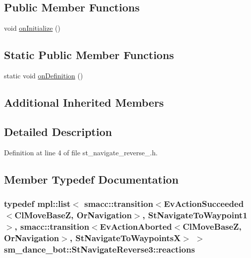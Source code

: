 \subsection*{Public Member Functions}
\begin{DoxyCompactItemize}
\item 
void \hyperlink{structsm__dance__bot_1_1StNavigateReverse3_a3b04480408724a0c98836d209e62266c}{on\+Initialize} ()
\end{DoxyCompactItemize}
\subsection*{Static Public Member Functions}
\begin{DoxyCompactItemize}
\item 
static void \hyperlink{structsm__dance__bot_1_1StNavigateReverse3_a5fff889087fa1b86b130ba7ac0f4ff76}{on\+Definition} ()
\end{DoxyCompactItemize}
\subsection*{Additional Inherited Members}


\subsection{Detailed Description}


Definition at line 4 of file st\+\_\+navigate\+\_\+reverse\+\_.\+h.



\subsection{Member Typedef Documentation}
\subsubsection[{\texorpdfstring{reactions}{reactions}}]{\setlength{\rightskip}{0pt plus 5cm}typedef mpl\+::list$<$ {\bf smacc\+::transition}$<$Ev\+Action\+Succeeded$<$Cl\+Move\+BaseZ, {\bf Or\+Navigation}$>$, {\bf St\+Navigate\+To\+Waypoint1}$>$, {\bf smacc\+::transition}$<$Ev\+Action\+Aborted$<$Cl\+Move\+BaseZ, {\bf Or\+Navigation}$>$, {\bf St\+Navigate\+To\+WaypointsX}$>$ $>$ {\bf sm\+\_\+dance\+\_\+bot\+::\+St\+Navigate\+Reverse3\+::reactions}}\hypertarget{structsm__dance__bot_1_1StNavigateReverse3_ae3d0ccf67dbf96dd45f316254491c022}{}\label{structsm__dance__bot_1_1StNavigateReverse3_ae3d0ccf67dbf96dd45f316254491c022}


